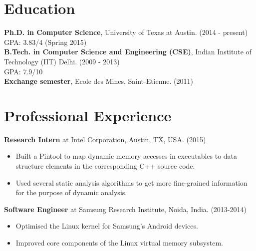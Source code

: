 \documentclass[margin]{res}
\begin{document}
 
 
 
\address{Department of Computer Science \\University of Texas at Austin \\ Austin, TX 78712 }

\address{+1 512-952-0104 \\ mihir@cs.utexas.edu }

 
\begin{resume} 
 

\section{Education} 
{\bf Ph.D. in Computer Science}, University of Texas at Austin. \hfill (2014 - present)\\
GPA: 3.83/4 \hfill (Spring 2015)\\
{\bf B.Tech. in Computer Science and Engineering (CSE)}, Indian Institute of
Technology (IIT) Delhi. \hfill (2009 - 2013)\\
GPA: 7.9/10\\
{\bf Exchange semester}, Ecole des Mines, Saint-Etienne. \hfill (2011)

\section{Professional Experience}
 
 {\bf Research Intern} at Intel Corporation, Austin, TX, USA. \hfill (2015)
 \begin{itemize} \itemsep -2pt  %
 \item Built a Pintool to map dynamic memory accesses in executables to
   data structure elements in the corresponding C++ source code.
 \item Used several static analysis algorithms to get more
   fine-grained information for the purpose of dynamic analysis.
 \end{itemize}

 {\bf Software Engineer} at Samsung Research Institute, Noida, India. \hfill (2013-2014)
 \begin{itemize} \itemsep -2pt  %
 \item Optimised the Linux kernel for Samsung's
   Android devices.
 \item Improved core components of the Linux virtual memory subsystem.
 \end{itemize}


\end{resume}
\end{document}
